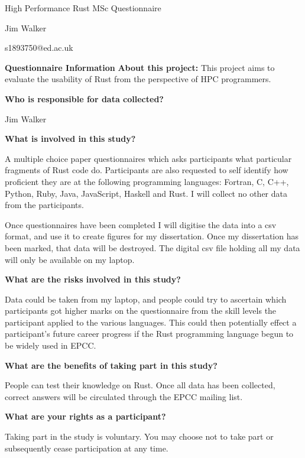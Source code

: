 \documentclass[11pt]{article} %
\begin{document}
\author{Jim Walker}
\begin{center}
\large {High Performance Rust MSc Questionnaire}

\normalsize Jim Walker

s1893750@ed.ac.uk
\end{center}
\textbf{Questionnaire Information}
\newline\newline
\noindent\textbf{About this project:}
\newline
\noindent This project aims to evaluate the usability of Rust from the perspective of HPC programmers.

\noindent\textbf{Who is responsible for data collected?}

\noindent Jim Walker

\noindent\textbf{What is involved in this study?}

\noindent A multiple choice paper questionnaires which asks participants what particular fragments of Rust code do. Participants are also requested to self identify how proficient they are at the following programming languages: Fortran, C, C++, Python, Ruby, Java, JavaScript, Haskell and Rust. I will collect no other data from the participants.

\noindent Once questionnaires have been completed I will digitise the data into a csv format, and use it to create figures for my dissertation. Once my dissertation has been marked, that data will be destroyed. The digital csv file holding all my data will only be available on my laptop.

\noindent\textbf{What are the risks involved in this study?}

\noindent Data could be taken from my laptop, and people could try to ascertain which participants got higher marks on  the questionnaire from the skill levels the participant applied to the various languages. This could then potentially effect a participant’s future career progress if the Rust programming language begun to be widely used in EPCC.

\noindent\textbf{What are the benefits of taking part in this study?}

\noindent People can test their knowledge on Rust. Once all data has been collected, correct answers will be circulated through the EPCC mailing list.

\noindent\textbf{What are your rights as a participant?}

\noindent Taking part in the study is voluntary. You may choose not to take part or subsequently cease participation at any time.
\end{document}
